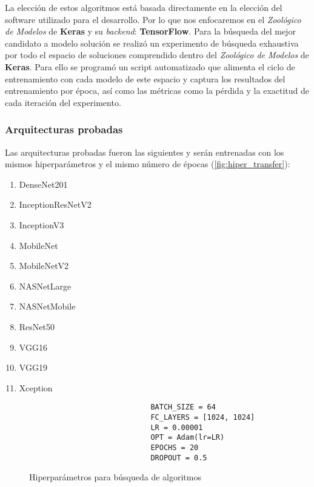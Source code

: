 La elección de estos algoritmos está basada directamente en la elección del
software utilizado para el desarrollo. Por lo que nos enfocaremos en el
\emph{Zoológico de Modelos} de \textbf{Keras} y su \emph{backend}:
\textbf{TensorFlow}. Para la búsqueda del mejor candidato a modelo solución se
realizó un experimento de búsqueda exhaustiva por todo el espacio de soluciones
comprendido dentro del \emph{Zoológico de Modelos} de \textbf{Keras}. Para ello
se programó un script automatizado que alimenta el ciclo de entrenamiento con
cada modelo de este espacio y captura los resultados del entrenamiento por
época, así como las métricas como la pérdida y la exactitud de cada iteración
del experimento.

\subsubsection{Arquitecturas probadas}

Las arquitecturas probadas fueron las siguientes y serán entrenadas con los
mismos hiperparámetros y el mismo número de épocas
(\autoref{fig:hiper_transfer}):

\begin{enumerate}
    \item DenseNet201
    \item InceptionResNetV2
    \item InceptionV3
    \item MobileNet
    \item MobileNetV2
    \item NASNetLarge
    \item NASNetMobile
    \item ResNet50
    \item VGG16
    \item VGG19
    \item Xception
\end{enumerate}

\begin{figure}[H]
    \centering
    \begin{verbatim}
                            BATCH_SIZE = 64
                            FC_LAYERS = [1024, 1024]
                            LR = 0.00001
                            OPT = Adam(lr=LR)
                            EPOCHS = 20
                            DROPOUT = 0.5
    \end{verbatim}
     \caption{Hiperparámetros para búsqueda de algoritmos}
     \label{fig:hiper_transfer}
\end{figure}

